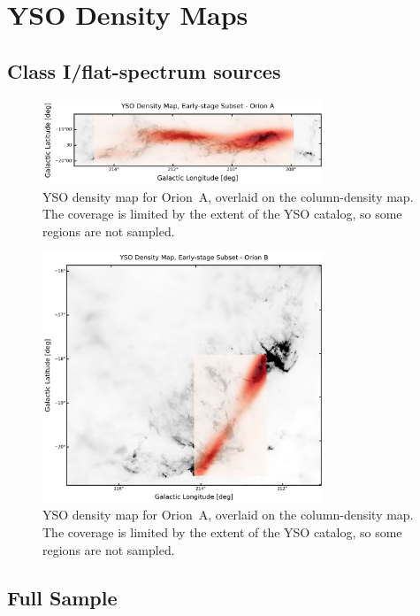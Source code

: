 \section{YSO Density Maps}

\subsection{Class I/flat-spectrum sources}

\begin{figure}[t]
    \centering
    \includegraphics[width=0.75\textwidth]{figures/YSOs_early_stage_density_Orion_A.png}
    \caption{YSO density map for Orion~A, overlaid on the column-density map. The coverage is limited by the extent of the YSO catalog, so some regions are not sampled.}
    \label{fig:YSOs_density_Map_A_early_stages}
\end{figure}

\begin{figure}[t]
    \centering
    \includegraphics[width=0.75\textwidth]{figures/YSOs_early_stage_density_Orion_B.png}
    \caption{YSO density map for Orion~A, overlaid on the column-density map. The coverage is limited by the extent of the YSO catalog, so some regions are not sampled.}
    \label{fig:YSOs_density_Map_B_early_stages}
\end{figure}

\subsection{Full Sample}


